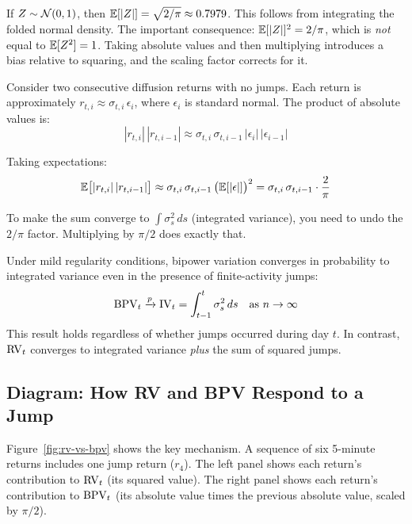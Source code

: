 \begin{prereq}
If $Z \sim \mathcal{N}(0,1)$, then $\mathbb{E}[|Z|] = \sqrt{2/\pi} \approx 0.7979$.
This follows from integrating the folded normal density.
The important consequence: $\mathbb{E}[|Z|]^2 = 2/\pi$, which is \emph{not} equal to $\mathbb{E}[Z^2] = 1$.
Taking absolute values and then multiplying introduces a bias relative to squaring, and the scaling factor corrects for it.
\end{prereq}

Consider two consecutive diffusion returns with no jumps.
Each return is approximately $r_{t,i} \approx \sigma_{t,i}\,\epsilon_i$, where $\epsilon_i$ is standard normal.
The product of absolute values is:
\[
  |r_{t,i}|\,|r_{t,i-1}| \approx \sigma_{t,i}\,\sigma_{t,i-1}\,|\epsilon_i|\,|\epsilon_{i-1}|
\]

Taking expectations:
\[
  \mathbb{E}\bigl[|r_{t,i}|\,|r_{t,i-1}|\bigr] \approx \sigma_{t,i}\,\sigma_{t,i-1}\,\bigl(\mathbb{E}[|\epsilon|]\bigr)^2 = \sigma_{t,i}\,\sigma_{t,i-1}\cdot\frac{2}{\pi}
\]

To make the sum converge to $\int \sigma^2_s\,ds$ (integrated variance), you need to undo the $2/\pi$ factor.
Multiplying by $\pi/2$ does exactly that.

\begin{keyresult}
Under mild regularity conditions, bipower variation converges in probability to integrated variance even in the presence of finite-activity jumps:
\[
  \operatorname{BPV}_t \xrightarrow{p} \operatorname{IV}_t = \int_{t-1}^{t}\sigma^2_s\,ds \quad \text{as } n \to \infty
\]
This result holds regardless of whether jumps occurred during day $t$.
In contrast, $\operatorname{RV}_t$ converges to integrated variance \emph{plus} the sum of squared jumps.
\end{keyresult}

\subsection{Diagram: How RV and BPV Respond to a Jump}

Figure~\ref{fig:rv-vs-bpv} shows the key mechanism.
A sequence of six 5-minute returns includes one jump return ($r_4$).
The left panel shows each return's contribution to $\operatorname{RV}_t$ (its squared value).
The right panel shows each return's contribution to $\operatorname{BPV}_t$ (its absolute value times the previous absolute value, scaled by $\pi/2$).

